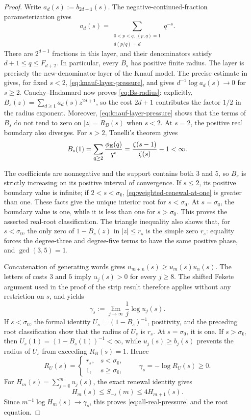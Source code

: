 \begin{proof}
Write \(a_d(s):=b_{2d+1}(s)\).  The negative-continued-fraction
parameterization gives
\[
 a_d(s)=\sum_{\substack{0<p<q,\ (p,q)=1\\d(p/q)=d}}q^{-s}.
\]
There are \(2^{d-1}\) fractions in this layer, and their denominators satisfy
\(d+1\le q\le F_{d+2}\).  In particular, every \(B_s\) has positive finite
radius.  The layer is precisely the new-denominator layer of the Knauf model.
 The precise estimate in  gives, for fixed
\(s<2\), \eqref{eq:knauf-layer-pressure}, and gives
\(d^{-1}\log a_d(s)\to0\) for \(s\ge2\).  Cauchy--Hadamard now proves
\eqref{eq:Bs-radius}: explicitly,
\(B_s(z)=\sum_{d\ge1}a_d(s)z^{2d+1}\), so the cost \(2d+1\) contributes the
factor \(1/2\) in the radius exponent.  Moreover,
\eqref{eq:knauf-layer-pressure} shows that
the terms of \(B_s\) do not tend to zero on \(|z|=R_B(s)\) when \(s<2\).
At \(s=2\), the positive real boundary also diverges.  For \(s>2\), Tonelli's
theorem gives
\begin{equation}
 B_s(1)=\sum_{q\ge2}\frac{\phi_{\rm E}(q)}{q^s}
 =\frac{\zeta(s-1)}{\zeta(s)}-1<\infty.
 \label{eq:weighted-renewal-at-one}
\end{equation}

The coefficients are nonnegative and the support contains both \(3\) and
\(5\), so \(B_s\) is strictly increasing on its positive interval of
convergence.  If \(s\le2\), its positive boundary value is infinite; if
\(2<s<\sigma_0\), \eqref{eq:weighted-renewal-at-one} is greater than one.
These facts give the unique interior root for \(s<\sigma_0\).  At
\(s=\sigma_0\), the boundary value is one, while it is less than one for
\(s>\sigma_0\).  This proves the asserted real-root classification.  The
triangle inequality also shows that, for \(s<\sigma_0\), the only zero of
\(1-B_s(z)\) in \(|z|\le r_s\) is the simple zero \(r_s\): equality forces
the degree-three and degree-five terms to have the same positive phase, and
\(\gcd(3,5)=1\).

Concatenation of generating words gives
\(u_{m+n}(s)\ge u_m(s)u_n(s)\).  The letters of costs \(3\) and \(5\) imply
\(u_j(s)>0\) for every \(j\ge8\).  The shifted Fekete argument used in the
proof of the strip result therefore applies without any restriction on
\(s\), and yields
\[
 \gamma_s:=\lim_{j\to\infty}\frac1j\log u_j(s).
\]
If \(s<\sigma_0\), the formal identity
\(U_s=(1-B_s)^{-1}\), positivity, and the preceding root classification show
that the radius of \(U_s\) is \(r_s\).  At \(s=\sigma_0\), it is one.  If
\(s>\sigma_0\), then \(U_s(1)=(1-B_s(1))^{-1}<\infty\), while
\(u_j(s)\ge b_j(s)\) prevents the radius of \(U_s\) from exceeding
\(R_B(s)=1\).  Hence
\[
 R_U(s)=\begin{cases}r_s,&s<\sigma_0,\\1,&s\ge\sigma_0,
 \end{cases}
 \qquad \gamma_s=-\log R_U(s)\ge0.
\]
For \(H_m(s)=\sum_{j=0}^m u_j(s)\), the exact renewal identity gives
\[
 H_m(s)\le S_{-s}(m)\le4H_{m+1}(s).
\]
Since \(m^{-1}\log H_m(s)\to\gamma_s\), this proves
\eqref{eq:all-real-pressure} and the root equation.


\end{proof}
